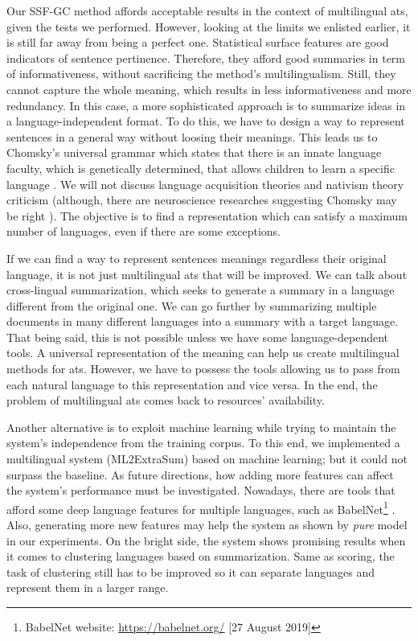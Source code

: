 Our SSF-GC method affords acceptable results in the context of multilingual \ac{ats}, given the tests we performed.
However, looking at the limits we enlisted earlier, it is still far away from being a perfect one. 
Statistical surface features are good indicators of sentence pertinence.
Therefore, they afford good summaries in term of informativeness, without sacrificing the method's multilingualism.
Still, they cannot capture the whole meaning, which results in less informativeness and more redundancy. 
In this case, a more sophisticated approach is to summarize ideas in a language-independent format. 
To do this, we have to design a way to represent sentences in a general way without loosing their meanings.
This leads us to Chomsky's universal grammar which states that there is an innate language faculty, which is genetically determined, that allows children to learn a specific language \citep{80-chomsky}.
We will not discuss language acquisition theories and nativism theory criticism (although, there are neuroscience researches suggesting Chomsky may be right \citep{16-ding-al}). 
The objective is to find a representation which can satisfy a maximum number of languages, even if there are some exceptions.


If we can find a way to represent sentences meanings regardless their original language, it is not just multilingual \ac{ats} that will be improved. 
We can talk about cross-lingual summarization, which seeks to generate a summary in a language different from the original one. 
We can go further by summarizing multiple documents in many different languages into a summary with a target language.
That being said, this is not possible unless we have some language-dependent tools. 
A universal representation of the meaning can help us create multilingual methods for \ac{ats}. 
However, we have to possess the tools allowing us to pass from each natural language to this representation and vice versa. 
In the end, the problem of multilingual \ac{ats} comes back to resources' availability.


Another alternative is to exploit machine learning while trying to maintain the system's independence from the training corpus. 
To this end, we implemented a multilingual system (ML2ExtraSum) based on machine learning; but it could not surpass the baseline.
As future directions, how adding more features can affect the system's performance must be investigated.
Nowadays, there are tools that afford some deep language features for multiple languages, such as BabelNet\footnote{BabelNet website: \url{https://babelnet.org/} [27 August 2019]} \citep{12-naigli-ponzetto}.
Also, generating more new features may help the system as shown by \textit{pure} model in our experiments. 
On the bright side, the system shows promising results when it comes to clustering languages based on summarization.
Same as scoring, the task of clustering  still has to be improved so it can separate languages and represent them in a larger range.